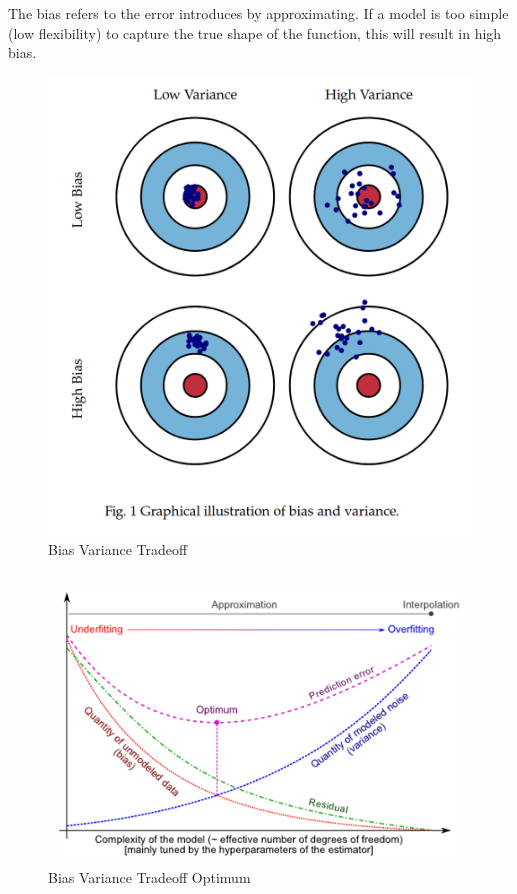 \documentclass[../Main.tex]{subfiles}
\begin{document}
The bias refers to the error introduces by approximating. If a model is too simple (low flexibility) to capture the true shape of the function, this will result in high bias.

\begin{figure}[H]
    \centering
    \includegraphics[width=0.5\linewidth]{Images/bias-variance-tradeoff.png}
    \caption{Bias Variance Tradeoff}
\end{figure}
\begin{figure}[H]
    \centering
    \includegraphics[width=0.5\linewidth]{Images/bias-variance-optimum.png}
    \caption{Bias Variance Tradeoff Optimum}
\end{figure}
\newpage
{}
\end{document}
